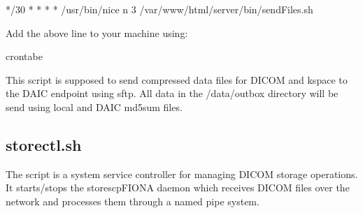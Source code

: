 \documentclass[letterpaper,10pt,english]{sphinxmanual}
\begin{document}
\begin{sphinxVerbatim}[commandchars=\\\{\}]
*/30 * * * * /usr/bin/nice \PYGZhy{}n 3 /var/www/html/server/bin/sendFiles.sh
\end{sphinxVerbatim}

\sphinxAtStartPar
Add the above line to your machine using:

\begin{sphinxVerbatim}[commandchars=\\\{\}]
\PYGZgt{}crontab\PYGZhy{}e
\end{sphinxVerbatim}

\sphinxAtStartPar
This script is supposed to send compressed data files for DICOM and k\sphinxhyphen{}space to the DAIC endpoint using sftp. All data in the /data/outbox directory will be send using local and DAIC md5sum files.

\sphinxstepscope


\subsection{storectl.sh}
\label{\detokenize{Architecture/scripts/storectl:storectl-sh}}\label{\detokenize{Architecture/scripts/storectl::doc}}
\sphinxAtStartPar
The  script is a system service controller for managing DICOM storage operations. It starts/stops the storescpFIONA daemon which receives DICOM files over the network and processes them through a named pipe system.

\sphinxAtStartPar
{}
\end{document}
